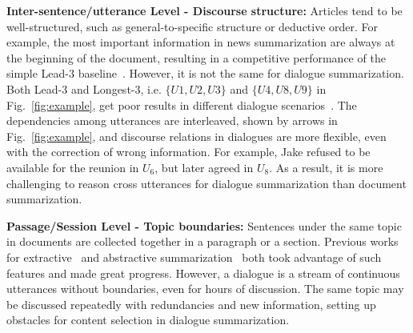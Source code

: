 \textbf{Inter-sentence/utterance Level - Discourse structure:}
Articles tend to be well-structured, such as 
general-to-specific structure or deductive order. 
For example, the most important information 
in news summarization are always at the beginning of the document, resulting in a competitive performance of the simple Lead-$3$ baseline~\cite{see2017get}. However, it is not the same for dialogue summarization. Both Lead-$3$ and Longest-$3$, i.e. $\{U1, U2, U3\}$ and $\{U4, U8, U9\}$ in Fig.~\ref{fig:example}, get poor results in different dialogue scenarios~\cite{gliwa2019samsum,chen2021dialsumm,zhang2021emailsum}.
The dependencies among utterances are interleaved, shown by arrows in Fig.~\ref{fig:example}, and discourse relations in dialogues are more flexible,
even with the correction of wrong information. 
For example, 
Jake refused to be available for the reunion in $U_6$, but later agreed
in $U_8$.  As a result, it is more challenging to reason cross utterances for 
dialogue summarization than document summarization.

\textbf{Passage/Session Level - Topic boundaries:} Sentences under the same topic in documents are collected together in a paragraph or a section.
Previous works for extractive~\cite{xiao2019extractive} and abstractive summarization~\cite{cohan2018discourse} both took advantage of such features and made great progress. 
However, a dialogue is a stream of continuous 
utterances without boundaries, even for hours of discussion. The same topic may be discussed repeatedly 
with redundancies and new information, setting up obstacles for content 
selection in dialogue summarization.

